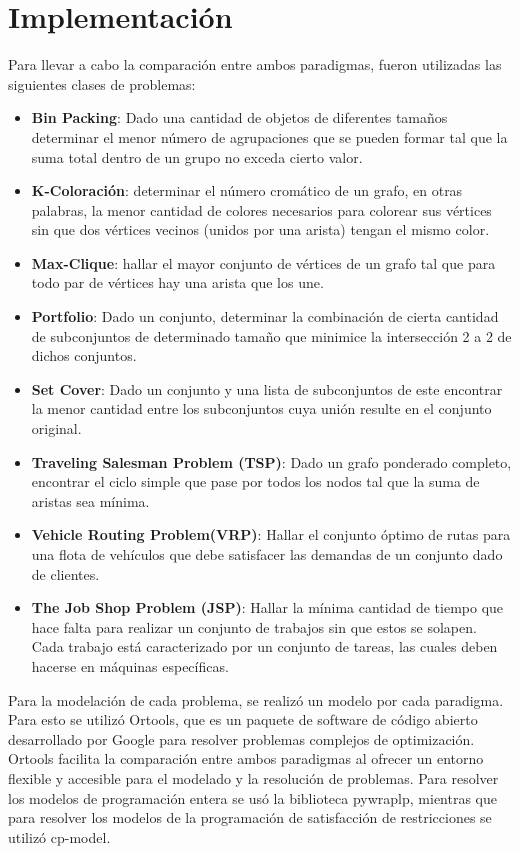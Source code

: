 \documentclass[12pt]{report}
\begin{document}
\chapter{Implementación}

Para llevar a cabo la comparación entre ambos paradigmas, fueron utilizadas las siguientes clases de problemas:
\begin{itemize}
\item \textbf{Bin Packing}: Dado una cantidad de objetos de diferentes tamaños determinar el menor número de agrupaciones que se pueden formar tal que la suma total dentro de un grupo no exceda cierto valor.
\item \textbf{K-Coloración}: determinar el número cromático de un grafo, en otras palabras, la menor cantidad de colores necesarios para colorear sus vértices sin que dos vértices vecinos (unidos por una arista) tengan el mismo color.
\item \textbf{Max-Clique}: hallar el mayor conjunto de vértices de un grafo tal que para todo par de vértices hay una arista que los une.
\item \textbf{Portfolio}: Dado un conjunto, determinar la combinación de cierta cantidad de subconjuntos de determinado tamaño que minimice la intersección 2 a 2 de dichos conjuntos.
\item \textbf{Set Cover}: Dado un conjunto y una lista de subconjuntos de este encontrar la menor cantidad entre los subconjuntos cuya unión resulte en el conjunto original.
\item \textbf{Traveling Salesman Problem (TSP)}: Dado un grafo ponderado completo, encontrar el ciclo simple que pase por todos los nodos tal que la suma de aristas sea mínima.
\item \textbf{Vehicle Routing Problem(VRP)}:  Hallar el conjunto óptimo de rutas para una flota de vehículos que debe satisfacer las demandas de un conjunto dado de clientes.
\item \textbf{The Job Shop Problem (JSP)}: Hallar la mínima cantidad de tiempo que hace falta para realizar un conjunto de trabajos sin que estos se solapen. Cada trabajo está caracterizado por un conjunto de tareas, las cuales deben hacerse en máquinas específicas.\\

\end{itemize}

Para la modelación de cada problema, se realizó un modelo por cada paradigma. Para esto se utilizó Ortools, que es un paquete de software de código abierto desarrollado por Google para resolver problemas complejos de optimización. Ortools facilita la comparación entre ambos paradigmas al ofrecer un entorno flexible y accesible para el modelado y la resolución de problemas. Para resolver los modelos de programación entera se usó la biblioteca pywraplp, mientras que para resolver los modelos de la programación de satisfacción de  restricciones se utilizó cp-model.\\
\end{document}
